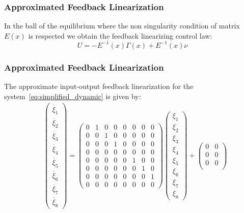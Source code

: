 %
\begin{frame}
\frametitle{Approximated Feedback Linearization}
In the ball of the equilibrium where the non singularity condition of matrix $E(x)$ is respected we obtain the feedback linearizing control law:
\begin{equation}
	U = -E^{-1}(x)\Gamma(x) + E^{-1}(x)\nu
\end{equation}
\end{frame}
%
\begin{frame}
\frametitle{Approximated Feedback Linearization}
The approximate input-output feedback linearization for the system~\ref{eq:simplified_dynamic} is given by:
\begin{equation}
	\begin{aligned}
	 	&\begin{pmatrix}
	 	\dot{\xi_1} \\
	 	\dot{\xi_2} \\
	 	\dot{\xi_3} \\
	 	\dot{\xi_4} \\
	 	\dot{\xi_5} \\
	 	\dot{\xi_6} \\
	 	\dot{\xi_7} \\
	 	\dot{\xi_8}
	 	\end{pmatrix}=%
	 	\begin{pmatrix}
	 		0 &1 &0 &0 &0 &0 &0 &0 \\
	 		0 &0 &1 &0 &0 &0 &0 &0 \\
	 		0 &0 &0 &1 &0 &0 &0 &0 \\
	 		0 &0 &0 &0 &0 &0 &0 &0 \\
	 		0 &0 &0 &0 &0 &1 &0 &0 \\
	 		0 &0 &0 &0 &0 &0 &1 &0 \\
	 		0 &0 &0 &0 &0 &0 &0 &1 \\
	 		0 &0 &0 &0 &0 &0 &0 &0
	 	\end{pmatrix}%
	 	\begin{pmatrix}
	 		\xi_1 \\ \xi_2 \\ \xi_3 \\ \xi_4 \\ \xi_5 \\ \xi_6 \\ \xi_7 \\ \xi_8
	 	\end{pmatrix}+%
	 	\begin{pmatrix}
	 		0 &0 \\
	 		0 &0 \\
	 		0 &0 \\

\end{pmatrix}
\end{aligned}
\end{equation}
\end{frame}
